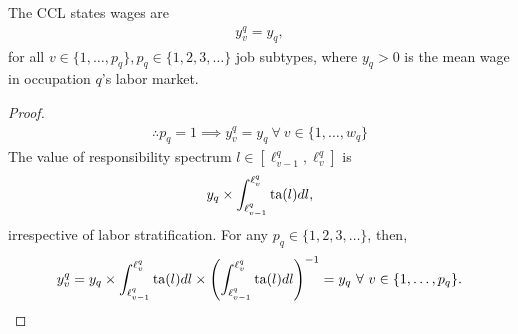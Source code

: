 \documentclass[hidelinks, nonatbib]{elsarticle}
\begin{document}
\begin{lemma}
    \label{ccl}
    The CCL states wages are
    \begin{gather}
        y_{v}^{q}
        =
        y_q
        ,
    \end{gather}
    for all $v \in \{1, \dots, p_q\}, p_q \in \{1, 2, 3, \dots\}$ job subtypes, where $y_q > 0 $ is the mean wage in occupation $q$'s labor market.

    \begin{proof}
        \begin{gather}
            \therefore
            p_q = 1
            \implies
            y_{v}^{q}
            =
            y_q
            \
            \forall
            \
            v \in \{1, \dots, w_q\}
        \end{gather}
        The value of responsibility spectrum $l \in [\ell_{v-1}^{q}, \ell_{v}^{q}]$ is
        \begin{gather}
            y_q
            \times
            \int_{\ell_{v-1}^{q}}^{\ell_{v}^{q}}
            \text{ta}(l)
            dl
            ,
        \end{gather}
        irrespective of labor stratification. For any $p_q \in \{1, 2, 3, \dots\}$, then,
        \begin{gather}
            y_{v}^{q}
            =
            y_q
            \times
            \int_{\ell_{v-1}^{q}}^{\ell_{v}^{q}}
            \text{ta}(l)
            dl
            \times
            \left(
                \int_{\ell_{v-1}^{q}}^{\ell_{v}^{q}}
                \text{ta}(l)
                dl
            \right) ^ {-1}
            =
            y_q
            \
            \forall
            \
            v \in \{1, \dots, p_q\}
            .
        \end{gather}
    \end{proof}
\end{lemma} 
\end{document}
